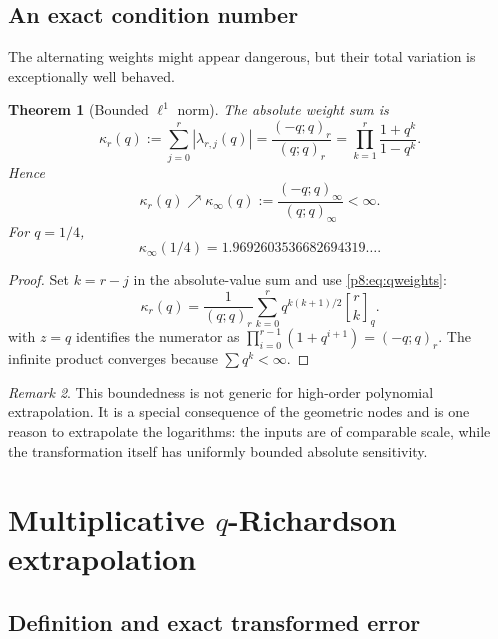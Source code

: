 \documentclass[11pt]{article}
\numberwithin{equation}{section}
\newtheorem{theorem}{Theorem}[section]
\theoremstyle{definition}
\theoremstyle{remark}
\newtheorem{remark}[theorem]{Remark}
\newcommand{\qbinom}[3]{\genfrac{[}{]}{0pt}{}{#1}{#2}_{#3}}
\begin{document}
\subsection{An exact condition number}

The alternating weights might appear dangerous, but their total variation is exceptionally well behaved.

\begin{theorem}[Bounded $\ell^1$ norm]
\label{p8:thm:qcondition}
The absolute weight sum is
\begin{equation}
\kappa_r(q):=\sum_{j=0}^{r}|\lambda_{r,j}(q)|
=\frac{(-q;q)_r}{(q;q)_r}
=\prod_{k=1}^{r}\frac{1+q^k}{1-q^k}.
\label{p8:eq:qcondition}
\end{equation}
Hence
\begin{equation}
\kappa_r(q)\nearrow \kappa_\infty(q)
:=\frac{(-q;q)_\infty}{(q;q)_\infty}<\infty.
\label{p8:eq:qcondition-limit}
\end{equation}
For $q=1/4$,
\begin{equation}
\kappa_\infty(1/4)=1.9692603536682694319\ldots.
\label{p8:eq:qcondition-dyadic}
\end{equation}
\end{theorem}

\begin{proof}
Set $k=r-j$ in the absolute-value sum and use \cref{p8:eq:qweights}:
\[
\kappa_r(q)=\frac1{(q;q)_r}
\sum_{k=0}^{r}q^{k(k+1)/2}\qbinom{r}{k}{q}.
\]
 with $z=q$ identifies the numerator as
$\prod_{i=0}^{r-1}(1+q^{i+1})=(-q;q)_r$. The infinite product converges because $\sum q^k<\infty$.
\end{proof}

\begin{remark}
This boundedness is not generic for high-order polynomial extrapolation. It is a special consequence of the geometric nodes and is one reason to extrapolate the logarithms: the inputs are of comparable scale, while the transformation itself has uniformly bounded absolute sensitivity.
\end{remark}

\section{Multiplicative \texorpdfstring{$q$}{q}-Richardson extrapolation}
\label{p8:sec:qrichardson}

\subsection{Definition and exact transformed error}
\end{document}
